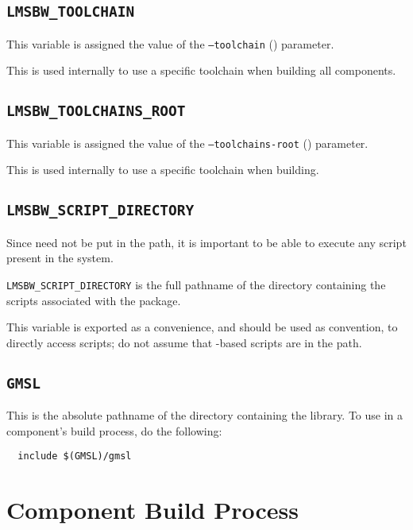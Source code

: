 \subsection{\texttt{LMSBW\_TOOLCHAIN}}

This variable is assigned the value of the \texttt{--toolchain}
() parameter.

This is used internally to use a specific toolchain when building all
components.

\subsection{\texttt{LMSBW\_TOOLCHAINS\_ROOT}}
\label{envvar:lmsbw-toolchains-root}

This variable is assigned the value of the \texttt{--toolchains-root}
() parameter.

This is used internally to use a specific toolchain when building.

\subsection{\texttt{LMSBW\_SCRIPT\_DIRECTORY}}
\label{envvars:lmsbw-script-directory}
Since \lmsbw need not be put in the path, it is important to be able
to execute any script present in the \lmsbw system.

\texttt{LMSBW\_SCRIPT\_DIRECTORY} is the full pathname of the
directory containing the scripts associated with the \lmsbw package.

This variable is exported as a convenience, and should be used as
convention, to directly access scripts; do not assume that
\lmsbw-based scripts are in the path.

\subsection{\texttt{GMSL}}

This is the absolute pathname of the directory containing the \gmsl
library.  To use \gmsl in a component's build process, do the
following:

\begin{verbatim}
  include $(GMSL)/gmsl
\end{verbatim}

\section{Component Build Process}

